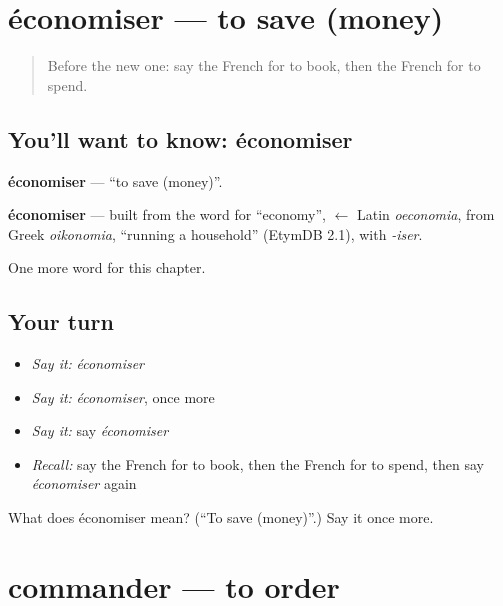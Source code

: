 \section[économiser]{économiser — to save (money)}

\label{lesson:FR-C205-economiser}



\begin{quote}
Before the new one: say the French for to book, then the French for to spend.
\end{quote}

\subsection*{You'll want to know: économiser}
\textbf{économiser} — \textquotedblleft{}to save (money)\textquotedblright{}.

\begin{cousinweb}
\textbf{économiser} — built from the word for \textquotedblleft{}economy\textquotedblright{}, $\leftarrow$ Latin \emph{oeconomia}, from Greek \emph{oikonomia}, \textquotedblleft{}running a household\textquotedblright{} (EtymDB 2.1), with \emph{-iser}.
\end{cousinweb}

\begin{grammarlens}[title={What you've built}]
One more word for this chapter.
\end{grammarlens}

\subsection*{Your turn}
\begin{itemize}
\raggedright
  \item \emph{Say it:} \emph{économiser}
  \item \emph{Say it:} \emph{économiser}, once more
  \item \emph{Say it:} say \emph{économiser}
  \item \emph{Recall:} say the French for to book, then the French for to spend, then say \emph{économiser} again
\end{itemize}

\begin{tcolorbox}[breakable,colback=teal!4,colframe=teal!35!black,title={Before you move on}]
What does économiser mean? (\textquotedblleft{}To save (money)\textquotedblright{}.) Say it once more.
\end{tcolorbox}
\section[commander]{commander — to order}

